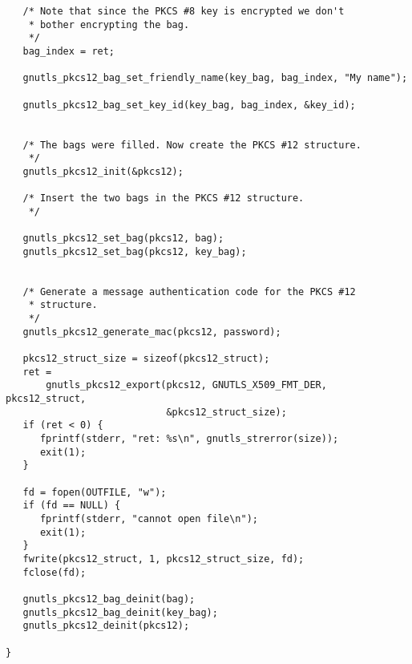 \begin{verbatim}
   /* Note that since the PKCS #8 key is encrypted we don't
    * bother encrypting the bag.
    */
   bag_index = ret;

   gnutls_pkcs12_bag_set_friendly_name(key_bag, bag_index, "My name");

   gnutls_pkcs12_bag_set_key_id(key_bag, bag_index, &key_id);


   /* The bags were filled. Now create the PKCS #12 structure.
    */
   gnutls_pkcs12_init(&pkcs12);

   /* Insert the two bags in the PKCS #12 structure.
    */

   gnutls_pkcs12_set_bag(pkcs12, bag);
   gnutls_pkcs12_set_bag(pkcs12, key_bag);


   /* Generate a message authentication code for the PKCS #12
    * structure.
    */
   gnutls_pkcs12_generate_mac(pkcs12, password);

   pkcs12_struct_size = sizeof(pkcs12_struct);
   ret =
       gnutls_pkcs12_export(pkcs12, GNUTLS_X509_FMT_DER, pkcs12_struct,
                            &pkcs12_struct_size);
   if (ret < 0) {
      fprintf(stderr, "ret: %s\n", gnutls_strerror(size));
      exit(1);
   }

   fd = fopen(OUTFILE, "w");
   if (fd == NULL) {
      fprintf(stderr, "cannot open file\n");
      exit(1);
   }
   fwrite(pkcs12_struct, 1, pkcs12_struct_size, fd);
   fclose(fd);

   gnutls_pkcs12_bag_deinit(bag);
   gnutls_pkcs12_bag_deinit(key_bag);
   gnutls_pkcs12_deinit(pkcs12);

}

\end{verbatim}
